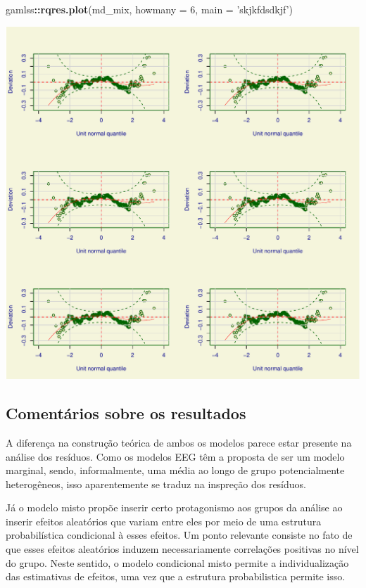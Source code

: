 \documentclass[
  11pt,
]{article}
\newenvironment{Shaded}{\begin{snugshade}}{\end{snugshade}}
\newcommand{\DataTypeTok}[1]{\textcolor[rgb]{0.13,0.29,0.53}{#1}}
\newcommand{\DecValTok}[1]{\textcolor[rgb]{0.00,0.00,0.81}{#1}}
\newcommand{\KeywordTok}[1]{\textcolor[rgb]{0.13,0.29,0.53}{\textbf{#1}}}
\newcommand{\NormalTok}[1]{#1}
\newcommand{\OperatorTok}[1]{\textcolor[rgb]{0.81,0.36,0.00}{\textbf{#1}}}
\newcommand{\StringTok}[1]{\textcolor[rgb]{0.31,0.60,0.02}{#1}}
\begin{document}
\begin{Shaded}
\begin{Highlighting}[]
\NormalTok{gamlss}\OperatorTok{::}\KeywordTok{rqres.plot}\NormalTok{(md_mix, }\DataTypeTok{howmany =} \DecValTok{6}\NormalTok{, }\DataTypeTok{main =} \StringTok{'skjkfdsdkjf'}\NormalTok{)}
\end{Highlighting}
\end{Shaded}

\begin{center}\includegraphics{lista3_files/figure-latex/unnamed-chunk-34-1} \end{center}

\hypertarget{comentuxe1rios-sobre-os-resultados}{%
\subsection{Comentários sobre os resultados}\label{comentuxe1rios-sobre-os-resultados}}

A diferença na construção teórica de ambos os modelos parece estar presente na análise dos resíduos. Como os modelos EEG têm a proposta de ser um modelo marginal, sendo, informalmente, uma média ao longo de grupo potencialmente heterogêneos, isso aparentemente se traduz na inspreção dos resíduos.

Já o modelo misto propõe inserir certo protagonismo aos grupos da análise ao inserir efeitos aleatórios que variam entre eles por meio de uma estrutura probabilística condicional à esses efeitos. Um ponto relevante consiste no fato de que esses efeitos aleatórios induzem necessariamente correlações positivas no nível do grupo. Neste sentido, o modelo condicional misto permite a individualização das estimativas de efeitos, uma vez que a estrutura probabilistica permite isso.
\end{document}
